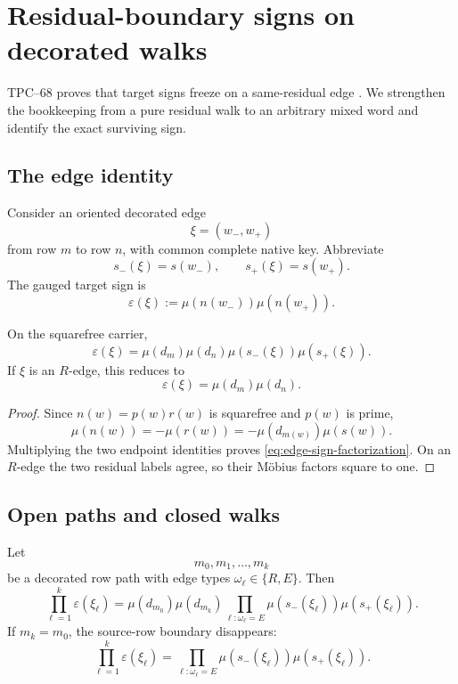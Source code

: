 \section{Residual-boundary signs on decorated walks}
\label{sec:residual-boundary}

TPC--68 proves that target signs freeze on a same-residual edge
\citep{WangTPC68}.  We strengthen the bookkeeping from a pure residual walk
to an arbitrary mixed word and identify the exact surviving sign.

\subsection{The edge identity}

Consider an oriented decorated edge
\[
 \xi=(w_-,w_+)
\]
from row \(m\) to row \(n\), with common complete native key.  Abbreviate
\[
 s_-(\xi)=s(w_-),\qquad s_+(\xi)=s(w_+).
\]
The gauged target sign is
\[
 \varepsilon(\xi)
 :=
 \mu(n(w_-))\mu(n(w_+)).
\]

\begin{lemma}
\label{lem:edge-sign-factorization}
On the squarefree carrier,
\begin{equation}
 \boxed{
 \varepsilon(\xi)
 =
 \mu(d_m)\mu(d_n)
 \mu(s_-(\xi))\mu(s_+(\xi)).}
 \label{eq:edge-sign-factorization}
\end{equation}
If \(\xi\) is an \(R\)-edge, this reduces to
\begin{equation}
 \varepsilon(\xi)=\mu(d_m)\mu(d_n).
 \label{eq:R-edge-frozen}
\end{equation}
\end{lemma}

\begin{proof}
Since \(n(w)=p(w)r(w)\) is squarefree and \(p(w)\) is prime,
\[
 \mu(n(w))=-\mu(r(w))
 =-\mu(d_{m(w)})\mu(s(w)).
\]
Multiplying the two endpoint identities proves
\eqref{eq:edge-sign-factorization}.  On an \(R\)-edge the two residual
labels agree, so their Möbius factors square to one.
\end{proof}

\subsection{Open paths and closed walks}

\begin{theorem}
\label{thm:residual-boundary-sign}
Let
\[
 m_0,m_1,\ldots,m_k
\]
be a decorated row path with edge types
\(\omega_\ell\in\{R,E\}\).  Then
\begin{equation}
 \boxed{
 \prod_{\ell=1}^k\varepsilon(\xi_\ell)
 =
 \mu(d_{m_0})\mu(d_{m_k})
 \prod_{\ell:\omega_\ell=E}
 \mu(s_-(\xi_\ell))\mu(s_+(\xi_\ell)).}
 \label{eq:open-path-boundary-sign}
\end{equation}
If \(m_k=m_0\), the source-row boundary disappears:
\begin{equation}
 \boxed{
 \prod_{\ell=1}^k\varepsilon(\xi_\ell)
 =
 \prod_{\ell:\omega_\ell=E}
 \mu(s_-(\xi_\ell))\mu(s_+(\xi_\ell)).}
 \label{eq:closed-walk-erasure-sign}
\end{equation}
\end{theorem}

